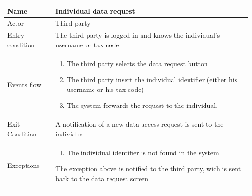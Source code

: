 \begin{tabular}{|l|p{11cm}|}
    \hline
    Name & Individual data request
    \\ \hline
    Actor & Third party
    \\ \hline 
    Entry condition & The third party is logged in and knows the individual's username or tax code
        \\ \hline
    Events flow &
    \begin{enumerate}
    \item The third party selects the data request button
	\item The third party insert the individual identifier (either his username or his tax code)
	\item The system forwards the request to the individual.
    \end{enumerate}
     \\ \hline
     Exit Condition & A notification of a new data access request is sent to the individual.
     \\
    \hline
    Exceptions &
        \begin{enumerate}
    \item The individual identifier is not found in the system.
    \end{enumerate}
     The exception above is notified to the third party, wich is sent back to the data request screen
        \\  \hline

\end{tabular}



